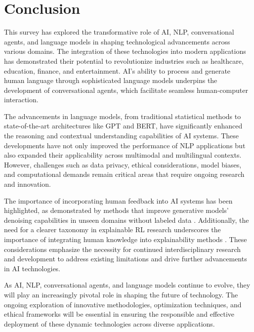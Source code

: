 \section{Conclusion} \label{sec:Conclusion}





This survey has explored the transformative role of AI, NLP, conversational agents, and language models in shaping technological advancements across various domains. The integration of these technologies into modern applications has demonstrated their potential to revolutionize industries such as healthcare, education, finance, and entertainment. AI's ability to process and generate human language through sophisticated language models underpins the development of conversational agents, which facilitate seamless human-computer interaction.



The advancements in language models, from traditional statistical methods to state-of-the-art architectures like GPT and BERT, have significantly enhanced the reasoning and contextual understanding capabilities of AI systems. These developments have not only improved the performance of NLP applications but also expanded their applicability across multimodal and multilingual contexts. However, challenges such as data privacy, ethical considerations, model biases, and computational demands remain critical areas that require ongoing research and innovation.



The importance of incorporating human feedback into AI systems has been highlighted, as demonstrated by methods that improve generative models' denoising capabilities in unseen domains without labeled data \cite{park2023domainadaptationbasedhuman}. Additionally, the need for a clearer taxonomy in explainable RL research underscores the importance of integrating human knowledge into explainability methods \cite{qing2023surveyexplainablereinforcementlearning}. These considerations emphasize the necessity for continued interdisciplinary research and development to address existing limitations and drive further advancements in AI technologies.



As AI, NLP, conversational agents, and language models continue to evolve, they will play an increasingly pivotal role in shaping the future of technology. The ongoing exploration of innovative methodologies, optimization techniques, and ethical frameworks will be essential in ensuring the responsible and effective deployment of these dynamic technologies across diverse applications.